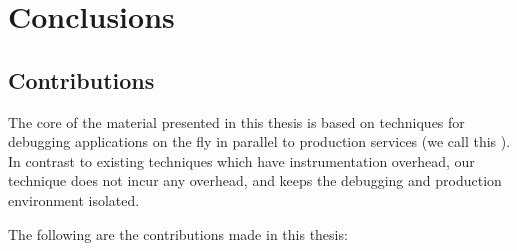 \chapter{Conclusions}
\label{ch:conclusions}

\section{Contributions}
\label{sec:contributions}

The core of the material presented in this thesis is based on techniques for debugging applications on the fly in parallel to production services (we call this \livedebugging). In contrast to existing techniques which have instrumentation overhead, our technique does not incur any overhead, and keeps the debugging and production environment isolated.

The following are the contributions made in this thesis:

